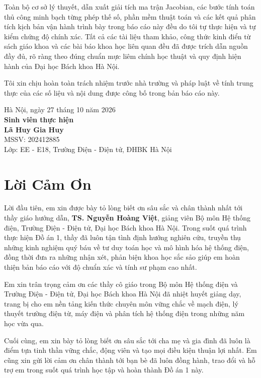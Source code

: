 \documentclass[12pt,a4paper,oneside]{report}
\begin{document}
Toàn bộ cơ sở lý thuyết, dẫn xuất giải tích ma trận Jacobian, các bước tính toán thủ công minh bạch từng phép thế số, phần mềm thuật toán và các kết quả phân tích kịch bản vận hành trình bày trong báo cáo này đều do tôi tự thực hiện và tự kiểm chứng độ chính xác. Tất cả các tài liệu tham khảo, công thức kinh điển từ sách giáo khoa và các bài báo khoa học liên quan đều đã được trích dẫn nguồn đầy đủ, rõ ràng theo đúng chuẩn mực liêm chính học thuật và quy định hiện hành của Đại học Bách khoa Hà Nội.

Tôi xin chịu hoàn toàn trách nhiệm trước nhà trường và pháp luật về tính trung thực của các số liệu và nội dung được công bố trong bản báo cáo này.

\vspace{45pt}
\begin{flushright}
    Hà Nội, ngày 27 tháng 10 năm 2026\\[12pt]
    \textbf{Sinh viên thực hiện}\\[45pt]
    \textbf{Lã Huy Gia Huy}\\
    MSSV: 202412885\\
    Lớp: EE - E18, Trường Điện - Điện tử, ĐHBK Hà Nội
\end{flushright}

\clearpage

\chapter*{Lời Cảm Ơn}

Lời đầu tiên, em xin được bày tỏ lòng biết ơn sâu sắc và chân thành nhất tới thầy giáo hướng dẫn, \textbf{TS. Nguyễn Hoàng Việt}, giảng viên Bộ môn Hệ thống điện, Trường Điện - Điện tử, Đại học Bách khoa Hà Nội. Trong suốt quá trình thực hiện Đồ án 1, thầy đã luôn tận tình định hướng nghiên cứu, truyền thụ những kinh nghiệm quý báu về tư duy toán học và mô hình hóa hệ thống điện, đồng thời đưa ra những nhận xét, phản biện khoa học sắc sảo giúp em hoàn thiện bản báo cáo với độ chuẩn xác và tính sư phạm cao nhất.

Em xin trân trọng cảm ơn các thầy cô giáo trong Bộ môn Hệ thống điện và Trường Điện - Điện tử, Đại học Bách khoa Hà Nội đã nhiệt huyết giảng dạy, trang bị cho em nền tảng kiến thức chuyên môn vững chắc về mạch điện, lý thuyết trường điện từ, máy điện và phân tích hệ thống điện trong những năm học vừa qua.

Cuối cùng, em xin bày tỏ lòng biết ơn sâu sắc tới cha mẹ và gia đình đã luôn là điểm tựa tinh thần vững chắc, động viên và tạo mọi điều kiện thuận lợi nhất. Em cũng xin gửi lời cảm ơn chân thành tới bạn bè đã luôn đồng hành, trao đổi và hỗ trợ em trong suốt quá trình học tập và hoàn thành Đồ án 1 này.
\end{document}
